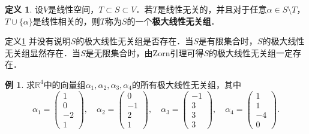 \documentclass[a4paper,fontset=windows]{ctexbook}
\theoremstyle{definition}
\newtheorem{definition}{定义}[chapter]
\newtheorem{example}{例}[chapter]
\def\note{\noindent\raisebox{10pt}{\dbend}\hspace{7pt}}
\begin{document}
\begin{definition}\label{def8.7}
设$V$是线性空间，$T\subset S\subset V$．若$T$是线性无关的，并且对于任意$\alpha\in S\setminus T$，$T\cup\{\alpha\}$是线性相关的，则$T$称为$S$的一个{\bf 极大线性无关组}．
\end{definition}

\note 定义\ref{def8.7} 并没有说明$S$的极大线性无关组是否存在．当$S$是有限集合时，$S$的极大线性无关组显然存在．当$S$是无限集合时，由Zorn引理可得$S$的极大线性无关组一定存在．

\begin{example}
求$\mathbb{R}^4$中的向量组$\alpha_1,\alpha_2,\alpha_3,\alpha_4$的所有极大线性无关组，其中
$$\alpha_1=\begin{pmatrix}1 \\ 0 \\ -2 \\ 1\end{pmatrix},\quad
\alpha_2=\begin{pmatrix}0 \\ -1 \\ 2 \\ 1\end{pmatrix},\quad
\alpha_3=\begin{pmatrix}-1 \\ 3 \\ 3 \\ 3\end{pmatrix},\quad
\alpha_4=\begin{pmatrix}1 \\ 1 \\ -4 \\ 0\end{pmatrix}.$$
\end{example}
\end{document}
